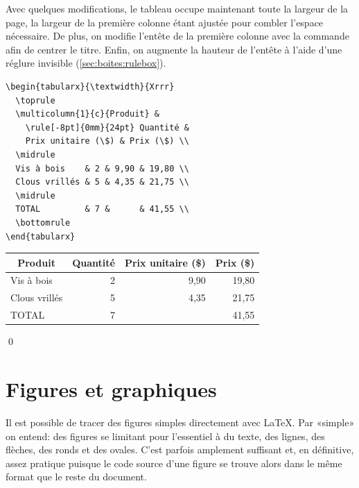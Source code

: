 \begin{exemple}
  Avec quelques modifications, le tableau occupe maintenant toute la
  largeur de la page, la largeur de la première colonne étant ajustée
  pour combler l'espace nécessaire. De plus, on modifie l'entête de la
  première colonne avec la commande \cmd{\multicolumn} afin de centrer
  le titre. Enfin, on augmente la hauteur de l'entête à l'aide d'une
  réglure invisible (\autoref{sec:boites:rulebox}).
\begin{lstlisting}
\begin{tabularx}{\textwidth}{Xrrr}
  \toprule
  \multicolumn{1}{c}{Produit} &
    \rule[-8pt]{0mm}{24pt} Quantité &
    Prix unitaire (\$) & Prix (\$) \\
  \midrule
  Vis à bois    & 2 & 9,90 & 19,80 \\
  Clous vrillés & 5 & 4,35 & 21,75 \\
  \midrule
  TOTAL         & 7 &      & 41,55 \\
  \bottomrule
\end{tabularx}
\end{lstlisting}
  \begin{center}
    \begin{tabularx}{\textwidth}{Xrrr}
      \toprule
      \multicolumn{1}{c}{Produit} &
      \rule[-8pt]{0mm}{24pt} Quantité & Prix unitaire (\$) & Prix (\$) \\
      \midrule
      Vis à bois    & 2 & 9,90 & 19,80 \\
      Clous vrillés & 5 & 4,35 & 21,75 \\
      \midrule
      TOTAL         & 7 &      & 41,55 \\
      \bottomrule
    \end{tabularx}
  \end{center}
  \qed
\end{exemple}



\section{Figures et graphiques}
\label{sec:tableaux:figures}

Il est possible de tracer des figures simples directement avec {\LaTeX}. Par «simple» on entend: des figures se
limitant  pour l'essentiel à du texte, des lignes, des flèches, des
ronds et des ovales. C'est parfois amplement suffisant et, en
définitive, assez pratique puisque le code source d'une figure se
trouve alors dans le même format que le reste du document.


